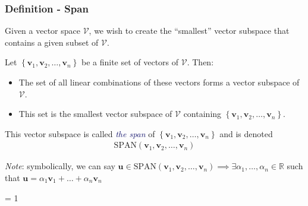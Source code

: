 \documentclass[usenames,dvipsnames,aspectratio=169,10pt]{beamer}
\def \EXAMPLEVERSION {1} %
\numberwithin{equation}{section}
\begin{document}
\begin{frame}
\frametitle{Definition - Span}
Given a vector space $\mathcal{V}$, we wish to create the ``smallest'' vector subspace that contains a given subset of $\mathcal{V}$.

Let $\left\{ \textbf{v}_1, \textbf{v}_2, \dots, \textbf{v}_n\right\}$ be a finite set of vectors of $\mathcal{V}$. Then:
\begin{itemize}
\item The set of all linear combinations of these vectors forms a vector subspace of $\mathcal{V}$.
\item This set is the smallest vector subspace of $\mathcal{V}$ containing $\left\{ \textbf{v}_1, \textbf{v}_2, \dots, \textbf{v}_n\right\}$.
\end{itemize}
This vector subspace is called \textcolor{MidnightBlue}{\textit{the span}} of $\left\{ \textbf{v}_1, \textbf{v}_2, \dots, \textbf{v}_n\right\}$ and is denoted
\begin{align*}
\text{SPAN}(\textbf{v}_1, \textbf{v}_2, \dots, \textbf{v}_n)
\end{align*}

\textit{Note}: symbolically, we can say $\textbf{u} \in \text{SPAN}(\textbf{v}_1, \textbf{v}_2, \dots, \textbf{v}_n) \implies \exists \alpha_1, \dots, \alpha_n \in \mathbb{R}$ such that $\textbf{u} = \alpha_1 \textbf{v}_1 + \dots + \alpha_n \textbf{v}_n$
\end{frame}


\ifnum \EXAMPLEVERSION = 1
\end{document}
